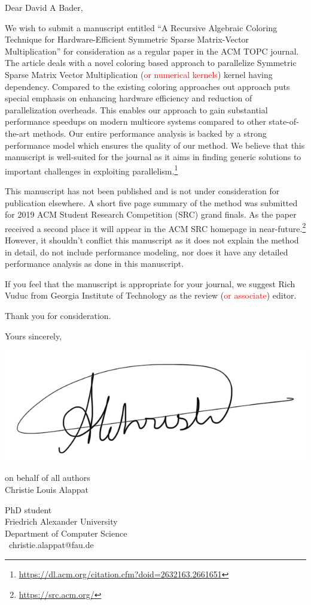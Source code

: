 \documentclass[english,10pt]{ethbrief3}
\date{June 01, 2019} %
\newcommand*{\marvosymbol}[1]{{\fontfamily{mvs}\fontencoding{U}\fontseries{m}\fontshape{n}\selectfont\char#1}}
\begin{document}

\opening{Dear David A Bader, }
We wish to submit a manuscript entitled ``A Recursive Algebraic Coloring Technique for
Hardware-Efficient Symmetric Sparse Matrix-Vector Multiplication'' for consideration as a regular
paper in the ACM TOPC journal. The article deals with a novel coloring based approach to 
parallelize Symmetric Sparse Matrix Vector Multiplication (\textcolor{red}{or numerical kernels}) 
kernel having dependency.  Compared to the existing coloring approaches out approach puts 
special emphasis on enhancing hardware efficiency and reduction of parallelization overheads.
This enables our approach to gain substantial performance speedups on modern multicore systems
compared to other state-of-the-art methods. Our entire performance analysis is backed by a strong 
performance model which ensures the quality of our method.
We believe that this manuscript is well-suited for the journal as it aims in finding
generic solutions to important challenges in exploiting parallelism.\footnote{\href{https://dl.acm.org/citation.cfm?doid=2632163.2661651}{https://dl.acm.org/citation.cfm?doid=2632163.2661651}}

This manuscript has not been published and is not under consideration for publication elsewhere.
A short five page summary of the method was submitted for 2019 ACM Student Research Competition (SRC) grand finals. 
As the paper received a second place it will appear in the ACM SRC homepage in near-future.\footnote{\href{https://src.acm.org/}{https://src.acm.org/}}
 However, it shouldn't conflict this manuscript as it does not explain
the method in detail, do not include performance modeling, nor does it have any
 detailed performance analysis as done in this manuscript.

If you feel that the manuscript is appropriate for your journal, we suggest Rich Vuduc 
from Georgia Institute of Technology as the review (\textcolor{red}{or associate}) editor.

Thank you for consideration.

\closing{Yours sincerely,}

\vspace{-2.7cm}

\includegraphics[width=0.28\linewidth]{signature_alappat_christie.png}

on behalf of all authors\\
Christie Louis Alappat

PhD student\\
Friedrich Alexander University\\
Department of Computer Science\\ 
\marvosymbol{66}~christie.alappat@fau.de\\
\end{document}
